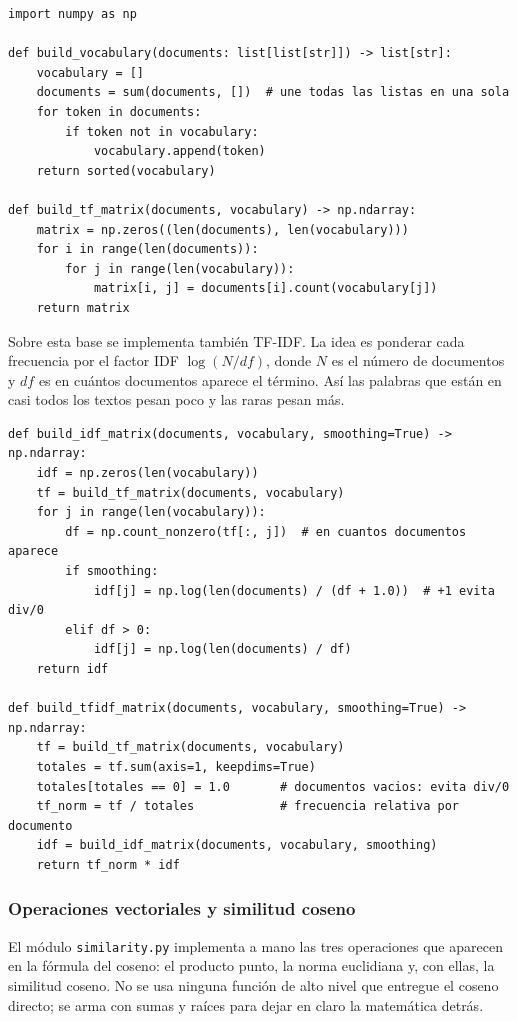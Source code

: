 \documentclass[12pt,a4paper]{article}
\begin{document}
\begin{lstlisting}[caption={Vocabulario y matriz de frecuencias (\texttt{vectorizer.py}).}]
import numpy as np

def build_vocabulary(documents: list[list[str]]) -> list[str]:
    vocabulary = []
    documents = sum(documents, [])  # une todas las listas en una sola
    for token in documents:
        if token not in vocabulary:
            vocabulary.append(token)
    return sorted(vocabulary)

def build_tf_matrix(documents, vocabulary) -> np.ndarray:
    matrix = np.zeros((len(documents), len(vocabulary)))
    for i in range(len(documents)):
        for j in range(len(vocabulary)):
            matrix[i, j] = documents[i].count(vocabulary[j])
    return matrix
\end{lstlisting}

Sobre esta base se implementa también TF-IDF. La idea es ponderar cada frecuencia por el factor IDF $\log(N / df)$, donde $N$ es el número de documentos y $df$ es en cuántos documentos aparece el término. Así las palabras que están en casi todos los textos pesan poco y las raras pesan más.

\begin{lstlisting}[caption={Ponderación TF-IDF (\texttt{vectorizer.py}).}]
def build_idf_matrix(documents, vocabulary, smoothing=True) -> np.ndarray:
    idf = np.zeros(len(vocabulary))
    tf = build_tf_matrix(documents, vocabulary)
    for j in range(len(vocabulary)):
        df = np.count_nonzero(tf[:, j])  # en cuantos documentos aparece
        if smoothing:
            idf[j] = np.log(len(documents) / (df + 1.0))  # +1 evita div/0
        elif df > 0:
            idf[j] = np.log(len(documents) / df)
    return idf

def build_tfidf_matrix(documents, vocabulary, smoothing=True) -> np.ndarray:
    tf = build_tf_matrix(documents, vocabulary)
    totales = tf.sum(axis=1, keepdims=True)
    totales[totales == 0] = 1.0       # documentos vacios: evita div/0
    tf_norm = tf / totales            # frecuencia relativa por documento
    idf = build_idf_matrix(documents, vocabulary, smoothing)
    return tf_norm * idf
\end{lstlisting}

\subsubsection{Operaciones vectoriales y similitud coseno}

El módulo \texttt{similarity.py} implementa a mano las tres operaciones que aparecen en la fórmula del coseno: el producto punto, la norma euclidiana y, con ellas, la similitud coseno. No se usa ninguna función de alto nivel que entregue el coseno directo; se arma con sumas y raíces para dejar en claro la matemática detrás.
\end{document}
